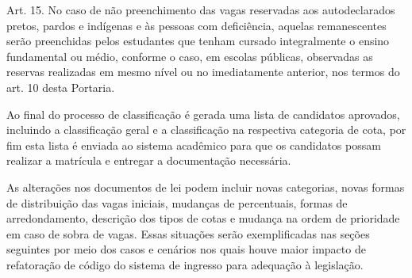 \begin{citacao}
Art. 15. No caso de não preenchimento das vagas reservadas aos autodeclarados pretos, pardos
e indígenas e às pessoas com deficiência, aquelas remanescentes serão preenchidas pelos
estudantes que tenham cursado integralmente o ensino fundamental ou médio, conforme o caso,
em escolas públicas, observadas as reservas realizadas em mesmo nível ou no imediatamente
anterior, nos termos do art. 10 desta Portaria. \cite{portarianr9}
\end{citacao}

Ao final do processo de classificação é gerada uma lista de candidatos aprovados, incluindo a classificação geral e a classificação na respectiva categoria de cota, por fim esta lista é enviada ao sistema acadêmico para que os candidatos possam realizar a matrícula e entregar a documentação necessária. 

As alterações nos documentos de lei podem incluir novas categorias, novas formas de distribuição das vagas iniciais, mudanças de percentuais, formas de arredondamento, descrição dos tipos de cotas e mudança na ordem de prioridade em caso de sobra de vagas. Essas situações serão exemplificadas nas seções seguintes por meio dos casos e cenários nos quais houve maior impacto de refatoração de código do sistema de ingresso para adequação à legislação.










